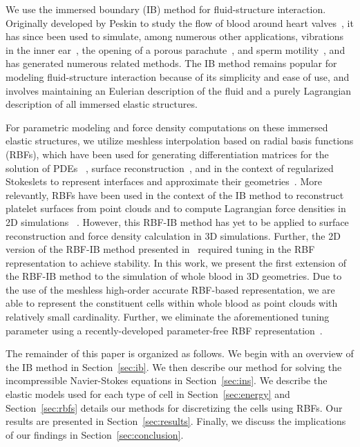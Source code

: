 We use the immersed boundary (IB) method for fluid-structure interaction. Originally
developed by Peskin to study the flow of blood around heart valves~\cite{Peskin:1972wa},
it has since been used to simulate, among numerous other applications, vibrations in the
inner ear~\cite{BeyerJr:1990tb}, the opening of a porous parachute~\cite{Kim:2006ku}, and
sperm motility~\cite{Dillon:2011cu}, and has generated numerous related methods. The IB
method remains popular for modeling fluid-structure interaction because of its simplicity
and ease of use, and involves maintaining an Eulerian description of the fluid and a
purely Lagrangian description of all immersed elastic structures.

For parametric modeling and force density computations on these immersed elastic
structures, we utilize meshless interpolation based on radial basis functions (RBFs),
which have been used for generating differentiation matrices for the solution of PDEs~%
\cite{Fasshauer:2007ui}, surface reconstruction~\cite{Hardy:1971tb,Carr:2001tb,
Shankar:2013ki, SFKSISC2018}, and in the context of regularized Stokeslets to represent
interfaces and approximate their geometries~\cite{Olson:2015ja}. More relevantly, RBFs
have been used in the context of the IB method to reconstruct platelet surfaces from
point clouds and to compute Lagrangian force densities in 2D simulations~%
\cite{Shankar:2015km}. However, this RBF-IB method has yet to be applied to surface
reconstruction and force density calculation in 3D simulations. Further, the 2D version
of the RBF-IB method presented in~\cite{Shankar:2015km} required tuning in the RBF
representation to achieve stability. In this work, we present the first extension of the
RBF-IB method to the simulation of whole blood in 3D geometries. Due to the use of the
meshless high-order accurate RBF-based representation, we are able to represent the
constituent cells within whole blood as point clouds with relatively small cardinality.
Further, we eliminate the aforementioned tuning parameter using a recently-developed
parameter-free RBF representation~\cite{SFKSISC2018}.

The remainder of this paper is organized as follows. We begin with an overview of the IB
method in Section~\ref{sec:ib}. We then describe our method for solving the
incompressible Navier-Stokes equations in Section~\ref{sec:ins}. We describe the elastic
models used for each type of cell in Section~\ref{sec:energy} and Section~\ref{sec:rbfs}
details our methods for discretizing the cells using RBFs. Our results are presented in
Section~\ref{sec:results}. Finally, we discuss the implications of our findings in
Section~\ref{sec:conclusion}.

